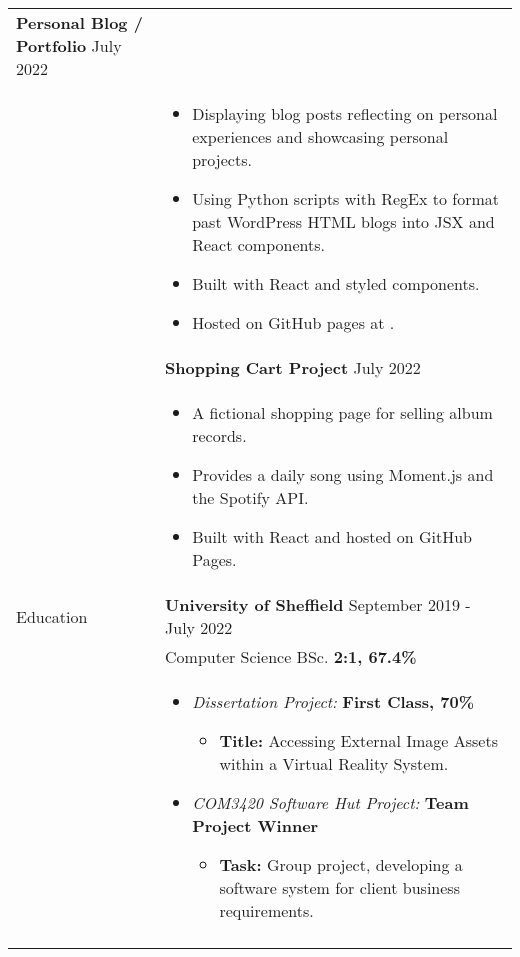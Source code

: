 \documentclass[12pt]{article}
\begin{document}
\begin{minipage}[t][0pt]{\linewidth}
\begin{tabular}[t]{p{2cm} p{14cm}}
		\textbf{Personal Blog / Portfolio}  \hfill July 2022 \\ &
		\begin{itemize}
			\renewcommand{\labelitemi}{$\diamond$}
			\item Displaying blog posts reflecting on personal experiences and showcasing personal projects.
			\item Using Python scripts with RegEx to format past WordPress HTML blogs into JSX and React components.
			\item Built with React and styled components. 
			\item Hosted on GitHub pages at \href{jluong23.github.io/blog}{\color{Blue}{jluong23.github.io/blog}}.
		\end{itemize} \\ &
		
		\textbf{Shopping Cart Project}  \hfill July 2022 \\ &
		\begin{itemize}
			\renewcommand{\labelitemi}{$\diamond$}
			\item A fictional shopping page for selling album records. 
			\item Provides a daily song using Moment.js and the Spotify API.
			\item Built with React and hosted on GitHub Pages.
		\end{itemize} \\
	{Education} &
		\textbf{University of Sheffield} \hfill September 2019 - July 2022 \\ &
		Computer Science BSc. \hfill \textbf{2:1, 67.4\%}  \\ &
	    \begin{itemize}
    		\renewcommand{\labelitemi}{$\diamond$}
        	    \item \textit{Dissertation Project:} \hfill \textbf{First Class, 70\%} 
        	    \begin{itemize}
    				\renewcommand{\labelitemii}{$\cdot$}
        			\item \textbf{Title:} Accessing External Image Assets within a Virtual Reality System.
			    \end{itemize}
	        	\item \textit{COM3420 Software Hut Project:} \hfill \textbf{Team Project Winner} 
        	    \begin{itemize}
    				\renewcommand{\labelitemii}{$\cdot$}
        			\item \textbf{Task:} Group project, developing a software system for client business requirements.
		        \end{itemize}
		\end{itemize} \\ &


\end{tabular}
\end{minipage}
\end{document}
